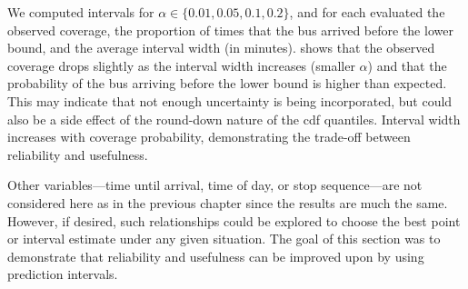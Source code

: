 We computed intervals for $\alpha \in \{0.01, 0.05, 0.1, 0.2\}$, and for each evaluated the observed coverage, the proportion of times that the bus arrived before the lower bound, and the average interval width (in minutes).  shows that the observed coverage drops slightly as the interval width increases (smaller $\alpha$) and that the probability of the bus arriving before the lower bound is higher than expected. This may indicate that not enough uncertainty is being incorporated, but could also be a side effect of the round-down nature of the \gls{cdf} quantiles. Interval width increases with coverage probability, demonstrating the trade-off between reliability and usefulness.


Other variables---time until arrival, time of day, or stop sequence---are not considered here as in the previous chapter since the results are much the same. However, if desired, such relationships could be explored to choose the best point or interval estimate under any given situation. The goal of this section was to demonstrate that reliability and usefulness can be improved upon by using prediction intervals.
